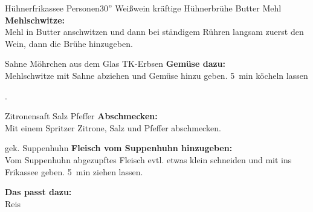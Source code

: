 \begin{MyRecipe}{Hühnerfrikassee}{ Personen}{30''}
\ingredient[\Calc{0.1}{\x}]{\si{\liter}} {Weißwein}
\ingredient[\Calc{0.3}{\x}]{\si{\liter}} {kräftige Hühnerbrühe}
\ingredient[\Calc{25}{\x}]{\si{\gram}} {Butter}
\ingredient[\Calc{25}{\x}]{\si{\gram}} {Mehl}
\textbf{Mehlschwitze:}\\
Mehl in Butter anschwitzen und dann bei ständigem Rühren langsam zuerst den Wein, dann die Brühe hinzugeben.\par\bigskip

\ingredient[\Calc{0.1}{\x}]{\si{\milli\liter}} {Sahne}
\ingredient[\Calc{0.15}{\x}]{\si{\gram}} {Möhrchen aus dem Glas}
\ingredient[\Calc{0.15}{\x}]{\si{\gram}} {TK-Erbsen}
\textbf{Gemüse dazu:}\\
Mehlschwitze mit Sahne abziehen und Gemüse hinzu geben. \SI{5}{\minute} köcheln lassen\par\bigskip.

 {Zitronensaft}
\ingredient[]{} {Salz}
\ingredient[]{} {Pfeffer}
\textbf{Abschmecken:}\\
Mit einem Spritzer Zitrone, Salz und Pfeffer abschmecken.\par\bigskip

\ingredient[]{} {gek. Suppenhuhn}
\textbf{Fleisch vom Suppenhuhn hinzugeben:}\\
Vom Suppenhuhn abgezupftes Fleisch evtl. etwas klein schneiden und mit ins Frikassee geben. \SI{5}{\minute} ziehen lassen.\par\bigskip

\textbf{Das passt dazu:}\\
Reis

\end{MyRecipe}